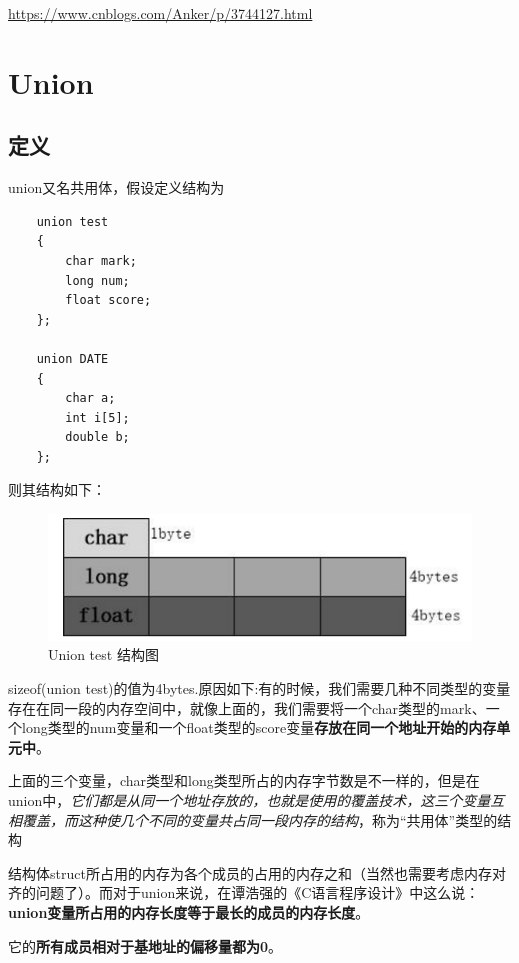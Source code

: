 \documentclass[UTF8,a4paper,12pt]{ctexbook} %
\begin{document}
       	\url{https://www.cnblogs.com/Anker/p/3744127.html}	
	\section{Union}     
        \subsection{定义} 
	        union又名共用体，假设定义结构为
	        \begin{lstlisting}
	union test
	{
		char mark;
		long num;
		float score;
	};
	
	union DATE
	{
		char a;
		int i[5];
		double b;
	};        
	        \end{lstlisting}
	        
	        则其结构如下：
	        \begin{figure}[H]
	        	\centering
	        	\includegraphics[width = 12cm]{union.png}
	        	\caption{Union test 结构图}
	        \end{figure} 
	        
	        sizeof(union test)的值为4bytes.原因如下:有的时候，我们需要几种不同类型的变量存在在同一段的内存空间中，就像上面的，我们需要将一个char类型的mark、一个long类型的num变量和一个float类型的score变量\textbf{存放在同一个地址开始的内存单元中}。
	        
	        上面的三个变量，char类型和long类型所占的内存字节数是不一样的，但是在union中，\textit{它们都是从同一个地址存放的，也就是使用的覆盖技术，这三个变量互相覆盖，而这种使几个不同的变量共占同一段内存的结构}，称为“共用体”类型的结构
	        
	        结构体struct所占用的内存为各个成员的占用的内存之和（当然也需要考虑内存对齐的问题了）。而对于union来说，在谭浩强的《C语言程序设计》中这么说：\textbf{union变量所占用的内存长度等于最长的成员的内存长度}。
	        
	        它的\textbf{所有成员相对于基地址的偏移量都为0}。
	        
\end{document}
